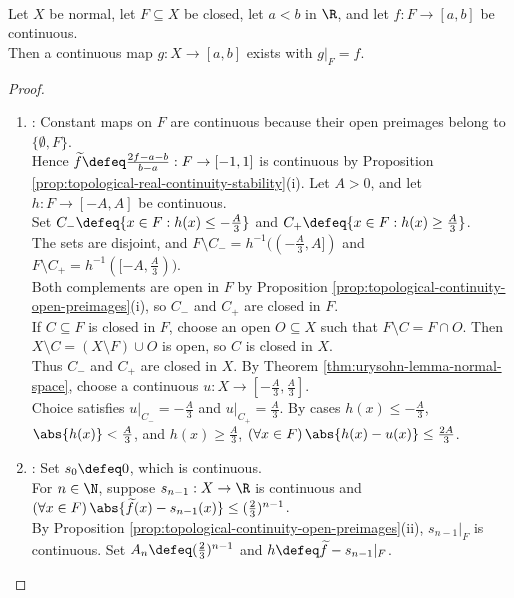 \begin{theorem} \label{thm:tietze-extension-bounded-normal-space} \\
Let $X$ be normal, let $F\subseteq X$ be closed, let $a<b$ in $\R$, and let $f:F\to[a,b]$ be continuous.\\
Then a continuous map $g:X\to[a,b]$ exists with $g|_F=f$.
\begin{proof}
\begin{enumerate}[label=(\roman*)]
\setlength{\itemsep}{0pt}
\item {}: Constant maps on $F$ are continuous because their open preimages belong to $\{\emptyset,F\}$.\\
Hence $\widetilde f\defeq\frac{2f-a-b}{b-a}:F\to[-1,1]$ is continuous by Proposition \ref{prop:topological-real-continuity-stability}(i). Let $A>0$, and let $h:F\to[-A,A]$ be continuous.\\
Set $C_-\defeq\{x\in F:h(x)\leq-\frac{A}{3}\}$ and $C_+\defeq\{x\in F:h(x)\geq\frac{A}{3}\}$.\\
The sets are disjoint, and $F\setminus C_-=h^{-1}((-\frac{A}{3},A])$ and $F\setminus C_+=h^{-1}([-A,\frac{A}{3}))$.\\
Both complements are open in $F$ by Proposition \ref{prop:topological-continuity-open-preimages}(i), so $C_-$ and $C_+$ are closed in $F$.\\
If $C\subseteq F$ is closed in $F$, choose an open $O\subseteq X$ such that $F\setminus C=F\cap O$. Then $X\setminus C=(X\setminus F)\cup O$ is open, so $C$ is closed in $X$.\\
Thus $C_-$ and $C_+$ are closed in $X$. By Theorem \ref{thm:urysohn-lemma-normal-space}, choose a continuous $u:X\to[-\frac{A}{3},\frac{A}{3}]$.\\
Choice satisfies $u|_{C_-}=-\frac{A}{3}$ and $u|_{C_+}=\frac{A}{3}$. By cases $h(x)\leq-\frac{A}{3}$, $\abs{h(x)}<\frac{A}{3}$, and $h(x)\geq\frac{A}{3}$, $(\forall x\in F)\,\abs{h(x)-u(x)}\leq\frac{2A}{3}$.
\item {}: Set $s_0\defeq0$, which is continuous.\\
For $n\in\N$, suppose $s_{n-1}:X\to\R$ is continuous and $(\forall x\in F)\,\abs{\widetilde f(x)-s_{n-1}(x)}\leq(\frac{2}{3})^{n-1}$.\\
By Proposition \ref{prop:topological-continuity-open-preimages}(ii), $s_{n-1}|_F$ is continuous. Set $A_n\defeq(\frac{2}{3})^{n-1}$ and $h\defeq\widetilde f-s_{n-1}|_F$.\\

\end{enumerate}
\end{proof}
\end{theorem}
